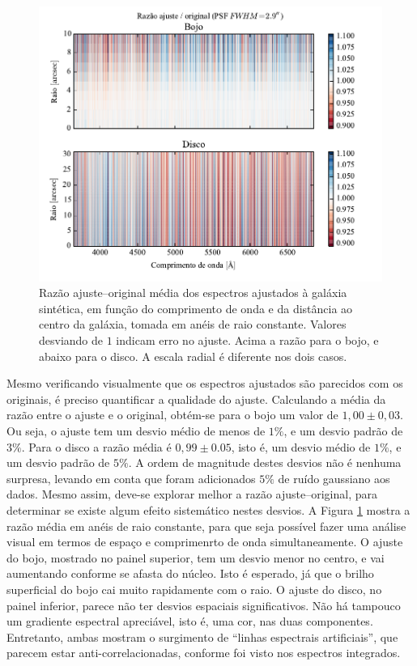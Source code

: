 \begin{figure}
	\includegraphics{figuras/simulation_error}
	\caption[Razão ajuste--original dos espectros ajustados à galáxia sintética]
	{Razão ajuste--original média dos espectros ajustados à galáxia sintética, em
	função do comprimento de onda e da distância ao centro da galáxia, tomada em
	anéis de raio constante. Valores desviando de $1$ indicam erro no ajuste.
	Acima a razão para o bojo, e abaixo para o disco. A escala radial é
	diferente nos dois casos.}
	\label{fig:testFitError}
\end{figure}

Mesmo verificando visualmente que os espectros ajustados são parecidos com os
originais, é preciso quantificar a qualidade do ajuste. Calculando a média da
razão entre o ajuste e o original, obtém-se para o bojo um valor de $1,00 \pm
0,03$. Ou seja, o ajuste tem um desvio médio de menos de $1\%$, e um desvio
padrão de $3\%$. Para o disco a razão média é $0,99 \pm 0.05$, isto é, um desvio
médio de $1\%$, e um desvio padrão de $5\%$. A ordem de magnitude destes desvios
não é nenhuma surpresa, levando em conta que foram adicionados $5\%$ de ruído
gaussiano aos dados. Mesmo assim, deve-se explorar melhor a razão
ajuste--original, para determinar se existe algum efeito sistemático nestes
desvios. A Figura \ref{fig:testFitError} mostra a razão média em anéis de raio
constante, para que seja possível fazer uma análise visual em termos de espaço e
comprimenrto de onda simultaneamente. O ajuste do bojo, mostrado no painel
superior, tem um desvio menor no centro, e vai aumentando conforme se afasta do
núcleo. Isto é esperado, já que o brilho superficial do bojo cai muito
rapidamente com o raio. O ajuste do disco, no painel inferior, parece não ter
desvios espaciais significativos.
Não há tampouco um gradiente espectral apreciável, isto é, uma cor, nas duas
componentes. Entretanto, ambas mostram o surgimento de ``linhas espectrais
artificiais'', que parecem estar anti-correlacionadas, conforme foi visto nos
espectros integrados.


